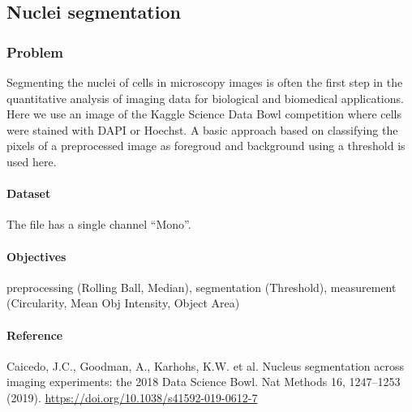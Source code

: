 \subsection{Nuclei segmentation} \label{sec:nuclei-segmentation}

\subsubsection*{Problem}

Segmenting the nuclei of cells in microscopy images is often the first step in the quantitative analysis of imaging data for biological and biomedical applications. Here we use an image of the Kaggle Science Data Bowl competition where cells were stained with DAPI or Hoechst. A basic approach based on classifying the pixels of a preprocessed image as foregroud and background using a threshold is used here.

\paragraph{Dataset} The file  has a single channel ``Mono''.

\paragraph{Objectives} preprocessing (Rolling Ball, Median), segmentation (Threshold), measurement (Circularity, Mean Obj Intensity, Object Area)


\paragraph{Reference} Caicedo, J.C., Goodman, A., Karhohs, K.W. et al. Nucleus segmentation across imaging experiments: the 2018 Data Science Bowl. Nat Methods 16, 1247–1253 (2019). \url{https://doi.org/10.1038/s41592-019-0612-7}


